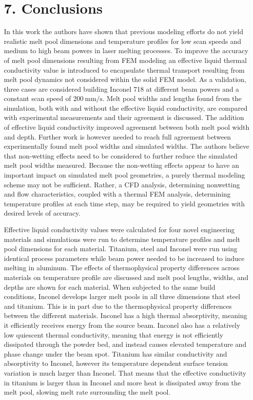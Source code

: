 \documentclass[10pt]{article}
\begin{document}
\section*{7. Conclusions}
In this work the authors have shown that previous modeling efforts do not yield realistic melt pool dimensions and temperature profiles for low scan speeds and medium to high beam powers in laser melting processes. To improve the accuracy of melt pool dimensions resulting from FEM modeling an effective liquid thermal conductivity value is introduced to encapsulate thermal transport resulting from melt pool dynamics not considered within the solid FEM model. As a validation, three cases are considered building Inconel 718 at different beam powers and a constant scan speed of $200 \mathrm{~mm} / \mathrm{s}$. Melt pool widths and lengths found from the simulation, both with and without the effective liquid conductivity, are compared with experimental measurements and their agreement is discussed. The addition of effective liquid conductivity improved agreement between both melt pool width and depth. Further work is however needed to reach full agreement between experimentally found melt pool widths and simulated widths. The authors believe that non-wetting effects need to be considered to further reduce the simulated melt pool widths measured. Because the non-wetting effects appear to have an important impact on simulated melt pool geometries, a purely thermal modeling scheme may not be sufficient. Rather, a CFD analysis, determining nonwetting and flow characteristics, coupled with a thermal FEM analysis, determining temperature profiles at each time step, may be required to yield geometries with desired levels of accuracy.

Effective liquid conductivity values were calculated for four novel engineering materials and simulations were run to determine temperature profiles and melt pool dimensions for each material. Titanium, steel and Inconel were run using identical process parameters while beam power needed to be increased to induce melting in aluminum. The effects of thermophysical property differences across materials on temperature profile are discussed and melt pool lengths, widths, and depths are shown for each material. When subjected to the same build conditions, Inconel develops larger melt pools in all three dimensions that steel and titanium. This is in part due to the thermophysical property differences between the different materials. Inconel has a high thermal absorptivity, meaning it efficiently receives energy from the source beam. Inconel also has a relatively low quiescent thermal conductivity, meaning that energy is not efficiently dissipated through the powder bed, and instead causes elevated temperature and phase change under the beam spot. Titanium has similar conductivity and absorptivity to Inconel, however its temperature dependent surface tension variation is much larger than Inconel. That means that the effective conductivity in titanium is larger than in Inconel and more heat is dissipated away from the melt pool, slowing melt rate surrounding the melt pool.
\end{document}
